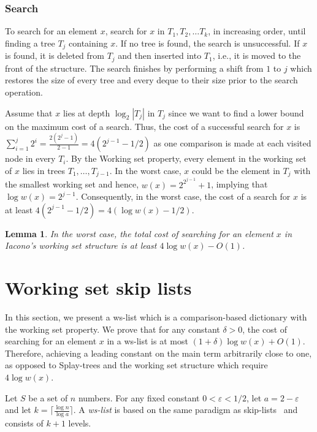 \documentclass[11pt]{article}       %
\newtheorem{lemma}{Lemma}
\newcommand{\wlist}{ws-list\xspace}
\begin{document}
\subsubsection*{Search} 
To search for an element $x$, search for $x$ in $T_1, T_2, \ldots T_k$, in increasing order, until finding a tree $T_j$ containing $x$. If no tree is found, the search is unsuccessful. If $x$ is found, it is deleted from $T_j$ and then inserted into $T_1$, i.e., it is moved to the front of the structure. The search finishes by performing a shift from $1$ to $j$ which restores the size of every tree and every deque to their size prior to the search operation.

Assume that $x$ lies at depth $\log_2 |T_j|$ in $T_j$ since we want to find a lower bound on the maximum cost of a search.
Thus, the cost of a successful search for $x$ is $\sum_{i=1}^j 2^i = \frac{2(2^j -1)}{2-1} = 4(2^{j-1} - 1/2)$ as one comparison is made at each visited node in every $T_i$.
By the Working set property, every element in the working set of $x$ lies in trees $T_1, \ldots, T_{j-1}$. 
In the worst case, $x$ could be the element in $T_j$ with the smallest working set and hence, $w(x) = 2^{2^{j-1}}+1$, implying that $\log w(x) = 2^{j-1}$.
Consequently, in the worst case, the cost of a search for $x$ is at least $4(2^{j-1} - 1/2) = 4 (\log w(x) - 1/2)$. 

\begin{lemma}\label{lemma:Iacono's structure cost}
In the worst case, the total cost of searching for an element $x$ in Iacono's working set structure is at least $4 \log w(x) - O(1)$.
\end{lemma}


\section{Working set skip lists}\label{section:New structure}
In this section, we present  a \wlist which is a comparison-based dictionary with the working set property. 
We prove that for any constant $\delta>0$, the cost of searching for an element $x$ in a \wlist is at most $(1+\delta)\log w(x) + O(1)$. Therefore, achieving a leading constant on the main term arbitrarily close to one, as opposed to Splay-trees and the working set structure which require $4\log w(x)$.

Let $S$ be a set of $n$ numbers.
For any fixed constant $0 < \varepsilon < 1/2$, let $a = 2-\varepsilon$ and let $k = \lceil \frac{\log n}{\log a}\rceil$. 
A \emph{\wlist} is based on the same paradigm as skip-lists~\cite{pugh1990skip} and consists of $k+1$ levels.
 
\end{document}
